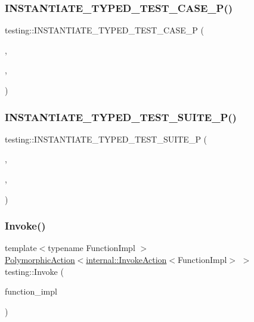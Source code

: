 \subsubsection{\texorpdfstring{INSTANTIATE\_TYPED\_TEST\_CASE\_P()}{INSTANTIATE\_TYPED\_TEST\_CASE\_P()}}
{\footnotesize\ttfamily testing\+::\+I\+N\+S\+T\+A\+N\+T\+I\+A\+T\+E\+\_\+\+T\+Y\+P\+E\+D\+\_\+\+T\+E\+S\+T\+\_\+\+C\+A\+S\+E\+\_\+P (\begin{DoxyParamCaption}\item[{My}]{,  }\item[{\mbox{\hyperlink{classtesting_1_1_code_location_for_t_y_p_e_d_t_e_s_t_p}{Code\+Location\+For\+T\+Y\+P\+E\+D\+T\+E\+S\+TP}}}]{,  }\item[{int}]{ }\end{DoxyParamCaption})}

\mbox{\label{namespacetesting_abc73aa914fde88c645367f862dbe81dd}} 
\subsubsection{\texorpdfstring{INSTANTIATE\_TYPED\_TEST\_SUITE\_P()}{INSTANTIATE\_TYPED\_TEST\_SUITE\_P()}}
{\footnotesize\ttfamily testing\+::\+I\+N\+S\+T\+A\+N\+T\+I\+A\+T\+E\+\_\+\+T\+Y\+P\+E\+D\+\_\+\+T\+E\+S\+T\+\_\+\+S\+U\+I\+T\+E\+\_\+P (\begin{DoxyParamCaption}\item[{My}]{,  }\item[{\mbox{\hyperlink{classtesting_1_1_code_location_for_t_y_p_e_d_t_e_s_t_p}{Code\+Location\+For\+T\+Y\+P\+E\+D\+T\+E\+S\+TP}}}]{,  }\item[{int}]{ }\end{DoxyParamCaption})}

\mbox{\label{namespacetesting_a12aebaf8363d49a383047529f798b694}} 
\subsubsection{\texorpdfstring{Invoke()}{Invoke()}\hspace{0.1cm}{\footnotesize\ttfamily [1/4]}}
{\footnotesize\ttfamily template$<$typename Function\+Impl $>$ \\
\mbox{\hyperlink{classtesting_1_1_polymorphic_action}{Polymorphic\+Action}}$<$\mbox{\hyperlink{classtesting_1_1internal_1_1_invoke_action}{internal\+::\+Invoke\+Action}}$<$Function\+Impl$>$ $>$ testing\+::\+Invoke (\begin{DoxyParamCaption}\item[{Function\+Impl}]{function\+\_\+impl }\end{DoxyParamCaption})}

